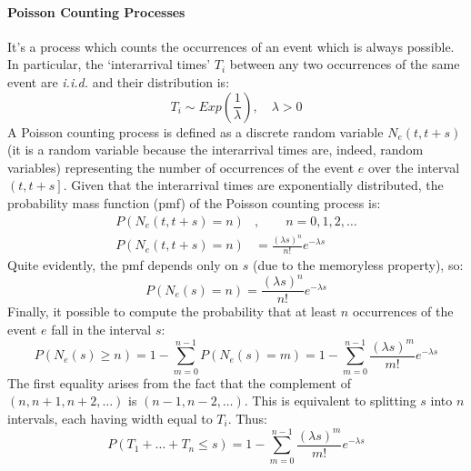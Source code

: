 \documentclass[12pt,a4paper]{article}
\begin{document}
\paragraph{Poisson Counting Processes} It's a process which counts the occurrences of an event which is always possible. In particular, the `interarrival times' $T_i$ between any two occurrences of the same event are \textit{i.i.d.} and their distribution is:
$$
T_i\sim Exp\left(\frac{1}{\lambda}\right), \quad \lambda > 0
$$
\noindent
A Poisson counting process is defined as a discrete random variable $N_e(t,t+s)$ (it is a random variable because the interarrival times are, indeed, random variables) representing the number of occurrences of the event $e$ over the interval $\left( t,t+s\right]$. Given that the interarrival times are exponentially distributed, the probability mass function (pmf) of the Poisson counting process is:
\begin{equation*}
\begin{split}
P\left(N_e(t,t+s)=n\right)&, \qquad n = 0,1,2,\dots \\
P\left(N_e(t,t+s)=n\right)& = \frac{(\lambda s)^n}{n!}e^{-\lambda s}
\end{split}
\end{equation*}
Quite evidently, the pmf depends only on $s$ (due to the memoryless property), so:
$$
P\left(N_e(s)=n\right) = \frac{(\lambda s)^n}{n!}e^{-\lambda s}
$$
\noindent
Finally, it possible to compute the probability that at least $n$ occurrences of the event $e$ fall in the interval $s$:
$$
P\left(N_e(s) \geq n\right) = 1 - \sum_{m=0}^{n-1}P\left(N_e(s) = m \right) = 1 - \sum_{m=0}^{n-1} \frac{(\lambda s)^m}{m!}e^{-\lambda s}
$$
The first equality arises from the fact that the complement of $(n,n+1,n+2,\dots)$ is $(n-1,n-2,\dots)$. This is equivalent to splitting $s$ into $n$ intervals, each having width equal to $T_i$. Thus:
$$
P(T_1 + \dots + T_n \leq s) = 1 - \sum_{m=0}^{n-1} \frac{(\lambda s)^m}{m!}e^{-\lambda s}
$$
\end{document}
